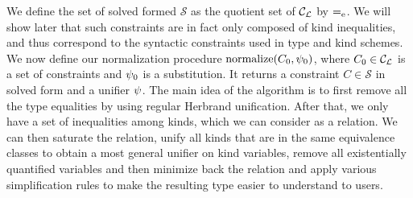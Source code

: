 
We define the set of solved formed
$\mathcal S$ as the quotient set of ${\mathcal C_{\mathcal L}}$ by $\operatorname{=_e}$.
We will show later that such constraints are in fact only composed of
kind inequalities, and thus correspond to the syntactic constraints
used in type and kind schemes.
%
We now define our normalization procedure $\operatorname{normalize}(C_0,\mathrm{\psi}_0)$, where
$C_0\in {\mathcal C_{\mathcal L}}$ is a set of constraints and $\mathrm{\psi}_0$ is a substitution.
It returns a constraint $C \in \mathcal S$ in
solved form and a unifier $\mathrm{\psi}$.
The main idea of the algorithm is to first remove all the type equalities
by using regular Herbrand unification. After that, we only have
a set of inequalities among kinds, which we can consider as a relation.
We can then saturate the relation,
unify all kinds that are in the same equivalence classes to obtain
a most general unifier on kind variables,
remove all existentially quantified variables and
then minimize back the relation and apply various
simplification rules to make the resulting type easier to understand to users.


